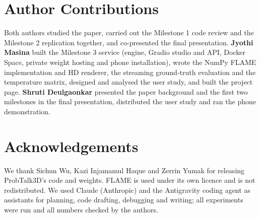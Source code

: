 \documentclass[10pt,twocolumn,letterpaper]{article}
\begin{document}
\section*{Author Contributions}
\small
Both authors studied the paper, carried out the Milestone 1 code review and the Milestone 2 replication together, and co-presented the final presentation. \textbf{Jyothi Masina} built the Milestone 3 service (engine, Gradio studio and API, Docker Space, private weight hosting and phone installation), wrote the NumPy FLAME implementation and HD renderer, the streaming ground-truth evaluation and the temperature matrix, designed and analysed the user study, and built the project page. \textbf{Shruti Deulgaonkar} presented the paper background and the first two milestones in the final presentation, distributed the user study and ran the phone demonstration.

\section*{Acknowledgements}
We thank Sichun Wu, Kazi Injamamul Haque and Zerrin Yumak for releasing ProbTalk3D's code and weights. FLAME is used under its own licence and is not redistributed. We used Claude (Anthropic) and the Antigravity coding agent as assistants for planning, code drafting, debugging and writing; all experiments were run and all numbers checked by the authors.
\end{document}
